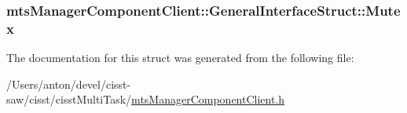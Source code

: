 \subsubsection[{Mutex}]{ mts\+Manager\+Component\+Client\+::\+General\+Interface\+Struct\+::\+Mutex}\label{structmts_manager_component_client_1_1_general_interface_struct_a4a55011d39513a9c87772939b0a23aad}


The documentation for this struct was generated from the following file\+:\begin{DoxyCompactItemize}
\item 
/\+Users/anton/devel/cisst-\/saw/cisst/cisst\+Multi\+Task/\hyperlink{mts_manager_component_client_8h}{mts\+Manager\+Component\+Client.\+h}\end{DoxyCompactItemize}
